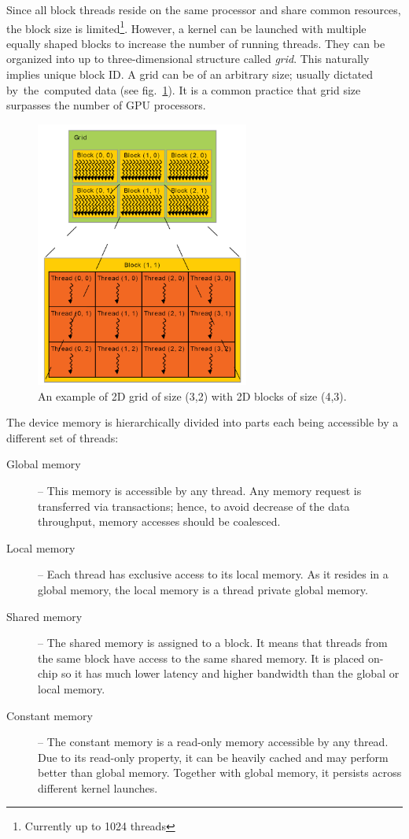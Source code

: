 Since all block threads reside on the same processor and share common resources, the block size is limited\footnote{Currently up to 1024 threads}. However, a kernel can be launched with multiple equally shaped blocks to increase the number of running threads. They can be organized into up to three-dimensional structure called \emph{grid}. This naturally implies unique block ID. A grid can be of an arbitrary size; usually dictated by~the~computed data (see fig.~\ref{fig02:grid}). It is a common practice that grid size surpasses the number of GPU processors.


\begin{figure}\centering
	\includegraphics[width=7cm]{img/grid}
	\caption{An example of 2D grid of size (3,2) with 2D blocks of size (4,3). }
	\label{fig02:grid}
\end{figure}


The device memory is hierarchically divided into parts each being accessible by a different set of threads:

\begin{description}
	\item[Global memory] -- This memory is accessible by any thread. Any memory request is transferred via transactions; hence, to avoid decrease of the data throughput, memory accesses should be coalesced. 
	\item[Local memory] -- Each thread has exclusive access to its local memory. As it resides in a global memory, the local memory is a thread private global memory.
	\item[Shared memory] -- The shared memory is assigned to a block. It means that threads from the same block have access to the same shared memory. It is placed on-chip so it has much lower latency and higher bandwidth than the global or local memory.
	\item[Constant memory] -- The constant memory is a read-only memory accessible by any thread. Due to its read-only property, it can be heavily cached and may perform better than global memory. Together with global memory, it persists across different kernel launches.
\end{description}

